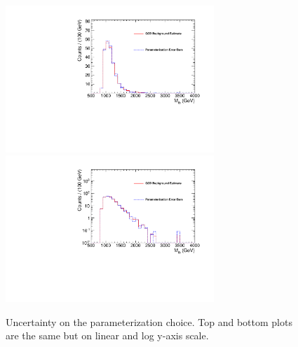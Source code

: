 \begin{figure}[htcb]
\begin{center}
\includegraphics[width=0.7\textwidth]{AN-13-004/figs/Mtb2dvs1dBE}\\
\includegraphics[width=0.7\textwidth]{AN-13-004/figs/Mtb2dvs1dBEsemilog}
\caption{
Uncertainty on the parameterization choice. Top and bottom plots are the same but on linear and log y-axis scale.
}
\label{figs:PARAMERROR}
\end{center}
\end{figure}


